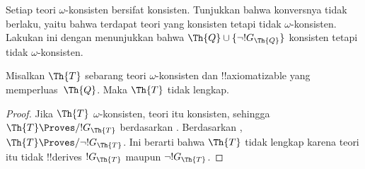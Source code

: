 \documentclass[../../../include/open-logic-section]{subfiles}
\begin{document}
\begin{prob}
  Setiap teori $\omega$-konsisten bersifat konsisten. Tunjukkan bahwa
  konversnya tidak berlaku, yaitu bahwa terdapat teori yang konsisten tetapi
  tidak $\omega$-konsisten. Lakukan ini dengan menunjukkan bahwa $\Th{Q} \cup
  \{\lnot !G_\Th{Q}\}$ konsisten tetapi tidak $\omega$-konsisten.
\end{prob}

\begin{thm}
 Misalkan $\Th{T}$ sebarang teori
$\omega$-konsisten dan !!{axiomatizable} yang memperluas~$\Th{Q}$. Maka
$\Th{T}$ tidak lengkap.
\end{thm}

\begin{proof}
  Jika $\Th{T}$ $\omega$-konsisten, teori itu konsisten, sehingga
  $\Th{T} \Proves/ !G_\Th{T}$ berdasarkan
  . Berdasarkan
  , $\Th{T} \Proves/ \lnot !G_\Th{T}$.
  Ini berarti bahwa $\Th{T}$ tidak lengkap karena teori itu tidak !!{derive}s
  $!G_\Th{T}$ maupun $\lnot !G_\Th{T}$.
\end{proof}
\end{document}
